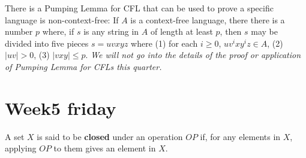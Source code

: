 \documentclass[12pt, oneside]{article}
\begin{document}
There is a Pumping Lemma for CFL that can be used to prove a specific language is non-context-free: 
If $A$ is a context-free language, there there
is a number $p$ where, if $s$ is any string in $A$ of length at least $p$, then $s$ may be divided 
into five pieces $s = uvxyz$ where (1) for each $i \geq 0$, $uv^ixy^iz \in A$, (2) $|uv|>0$, (3) $|vxy| \leq p$.
{\it We will not go into the details of the proof or application of Pumping Lemma for CFLs this quarter.} \vfill
\section*{Week5 friday}


A set $X$ is said to be {\bf closed} under an operation $OP$ if, for any elements in $X$, applying 
$OP$ to them gives an element in $X$.  
\end{document}
